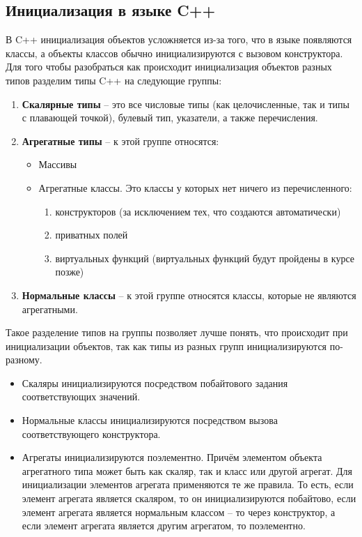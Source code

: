 \documentclass{article}
\begin{document}
\subsection*{Инициализация в языке C++}
В C++ инициализация объектов усложняется из-за того, что в языке появляются классы, а объекты классов обычно инициализируются с вызовом конструктора. Для того чтобы разобраться как происходит инициализация объектов разных типов разделим типы C++ на следующие группы:
\begin{enumerate}
\item \textbf{Скалярные типы} -- это все числовые типы (как целочисленные, так и типы с плавающей точкой), булевый тип, указатели, а также перечисления.
\item \textbf{Агрегатные типы} -- к этой группе относятся:
\begin{itemize}
\item Массивы
\item Агрегатные классы. Это классы у которых нет ничего из перечисленного:
\begin{enumerate}
\item конструкторов (за исключением тех, что создаются автоматически)
\item приватных полей
\item виртуальных функций (виртуальных функций будут пройдены в курсе позже)
\end{enumerate}
\end{itemize}
\item \textbf{Нормальные классы} -- к этой группе относятся классы, которые не являются агрегатными.
\end{enumerate}
Такое разделение типов на группы позволяет лучше понять, что происходит при инициализации объектов, так как типы из разных групп инициализируются по-разному.

\begin{itemize}
\item Скаляры инициализируются посредством побайтового задания соответствующих значений.
\item Нормальные классы инициализируются посредством вызова соответствующего конструктора.
\item Агрегаты инициализируются поэлементно. Причём элементом объекта агрегатного типа может быть как скаляр, так и класс или другой агрегат. Для инициализации элементов агрегата применяются те же правила. То есть, если элемент агрегата является скаляром, то он инициализируются побайтово, если элемент агрегата является нормальным классом -- то через конструктор, а если элемент агрегата является другим агрегатом, то поэлементно.
\end{itemize}
\end{document}
